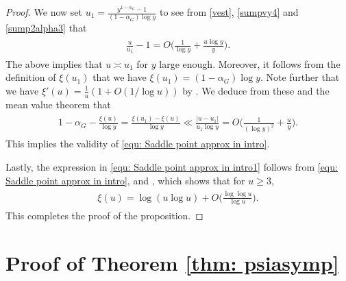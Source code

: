 \documentclass[twoside,leqno,10pt, A4]{amsart}
\begin{document}
\begin{proof}
 We now set $u_1=\frac {y^{1-\alpha_G}-1}{(1-\alpha_G)\log y}$ to see from \eqref{vest}, \eqref{sumpvy4} and \eqref{sump2alpha3} that
\begin{align*}
\begin{split}
  \frac {u}{u_1}-1=O\Big (\frac 1{\log y}+ \frac {u\log y}{y}\Big).
\end{split}
\end{align*} 
 The above implies that $u \asymp u_1$ for $y$ large enough. Moreover, it follows from the definition of $\xi(u_1)$ that we have $\xi(u_1)=(1-\alpha_G)\log y$. Note further that we have $\xi'(u) =\frac 1u(1+O(1/\log u))$ by \cite[Lemma 4, ii)]{Hildebrand86}. We deduce from these and the mean value theorem that
\begin{align*}
\begin{split}
  1-\alpha_G-\frac {\xi(u)}{\log y}=\frac {\xi(u_1)-\xi(u)}{\log y} \ll \frac {|u-u_1|}{u_1\log y}=O\Big(\frac 1{(\log y)^2}+ \frac {u}{y} \Big ).
\end{split}
\end{align*}   
  This implies the validity of \eqref{equ: Saddle point approx in intro}. 

  Lastly, the expression in \eqref{equ: Saddle point approx in intro1} follows from \eqref{equ: Saddle point approx in intro}, and \cite[Lemma 1]{HT86}, which shows that for $u \geq 3$,
\begin{align*}
\begin{split}
 \xi(u)=\log (u \log u)+O\Big(\frac {\log \log u}{\log u} \Big ).
\end{split}
\end{align*}   
 This completes the proof of the proposition. 
\end{proof}


 

\section{Proof of Theorem \ref{thm: psiasymp}}
\end{document}

